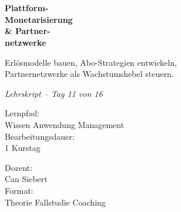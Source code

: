 \documentclass[11pt,a4paper,oneside]{article}
\newcommand{\caveatfontfallback}{\itshape}
\newcommand\caveatfont{\caveatfontfallback}%
\begin{document}
\begin{titlepage}
  \pagestyle{empty}
  \vspace*{1.5cm}
  \\[2pt]
  \noindent{\color{lpAccent}\rule{\linewidth}{1.2pt}}\\[4pt]

  \vspace{3cm}
  {\sffamily\fontsize{30}{34}\selectfont\bfseries\color{lpInk}Plattform-\\Monetarisierung\\\& Partner-\\netzwerke\par}

  \vspace{0.7cm}
  {\sffamily\large\color{lpGray}Erlösmodelle bauen, Abo-Strategien entwickeln,\\Partnernetzwerke als Wachstumshebel steuern.\par}

  \vspace{1.5cm}
  {\caveatfont\LARGE\color{lpAmber}Lehrskript -- Tag 11 von 16}\par

  \vfill

  \noindent\begin{minipage}{0.55\linewidth}
    {\sffamily\footnotesize\color{lpGray}Lernpfad:}\\
    {\sffamily\small\color{lpInk}Wissen \textrightarrow{} Anwendung \textrightarrow{} Management}\\[10pt]
    {\sffamily\footnotesize\color{lpGray}Bearbeitungsdauer:}\\
    {\sffamily\small\color{lpInk}1 Kurstag}
  \end{minipage}\hfill
  \begin{minipage}{0.4\linewidth}
    \raggedleft
    {\sffamily\footnotesize\color{lpGray}Dozent:}\\
    {\sffamily\small\color{lpInk}Can Siebert}\\[10pt]
    {\sffamily\footnotesize\color{lpGray}Format:}\\
    {\sffamily\small\color{lpInk}Theorie \textperiodcentered{} Fallstudie \textperiodcentered{} Coaching}
  \end{minipage}

  \vspace{0.5cm}
  \noindent{\color{lpAccent}\rule{\linewidth}{0.6pt}}
\end{titlepage}
\end{document}

